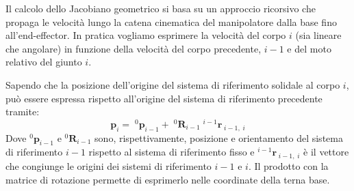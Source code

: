 ﻿\documentclass[11pt, a4paper]{article}
\begin{document}
\begin{minipage}[c]{0.48\textwidth}
\end{minipage}
\begin{minipage}[c]{0.5\textwidth}
    Il calcolo dello Jacobiano geometrico si basa su un approccio ricorsivo che propaga le velocità lungo la catena cinematica del manipolatore dalla base fino all'end-effector. In pratica vogliamo esprimere la velocità del corpo \(i\) (sia lineare che angolare) in funzione della velocità del corpo precedente, \(i-1\) e del moto relativo del giunto \(i\).
\end{minipage}

Sapendo che la posizione dell'origine del sistema di riferimento solidale al corpo \(i\), può essere espressa rispetto all'origine del sistema di riferimento precedente tramite:
\[
    \bm{p}_i = \;^{0}\bm{p}_{i-1} + \;^{0}\bm{R}_{i-1} \;^{i-1}{\bm{r}}_{\; i-1, \; i}
\]
Dove \(^{0}\bm{p}_{i-1}\) e \(^{0}\bm{R}_{i-1} \) sono, rispettivamente, posizione e orientamento del sistema di riferimento \(i-1\) rispetto al sistema di riferimento fisso e \(^{i-1}{\bm{r}}_{\; i-1, \; i}\) è il vettore che congiunge le origini dei sistemi di riferimento \(i-1\) e \(i\). Il prodotto con la matrice di rotazione permette di esprimerlo nelle coordinate della terna base.
\end{document}
